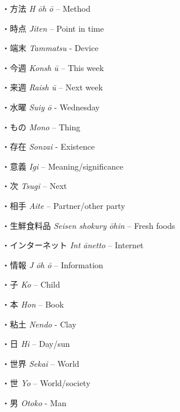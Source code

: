 \par{・方法 \emph{H }\emph{ōh }\emph{ō }– Method }

\par{・時点 \emph{Jiten }– Point in time }

\par{・端末 \emph{Tammatsu }- Device }

\par{・今週 \emph{Konsh }\emph{ū }– This week }

\par{・来週 \emph{Raish }\emph{ū }– Next week }

\par{・水曜 \emph{Suiy }\emph{ō }- Wednesday }

\par{・もの \emph{Mono }– Thing }

\par{・存在 \emph{Sonzai }- Existence }

\par{・意義 \emph{Igi }– Meaning\slash significance }

\par{・次 \emph{Tsugi }– Next }

\par{・相手 \emph{Aite }– Partner\slash other party }

\par{・生鮮食料品 \emph{Seisen shokury }\emph{ōhin }– Fresh foods }

\par{・インターネット \emph{Int }\emph{ānetto }– Internet }

\par{・情報 \emph{J }\emph{ōh }\emph{ō }– Information }

\par{・子 \emph{Ko }– Child }

\par{・本 \emph{Hon }– Book }

\par{・粘土 \emph{Nendo }- Clay }

\par{・日 \emph{Hi }– Day\slash sun }

\par{・世界 \emph{Sekai }– World }

\par{・世 \emph{Yo }– World\slash society }

\par{・男 \emph{Otoko }- Man }

